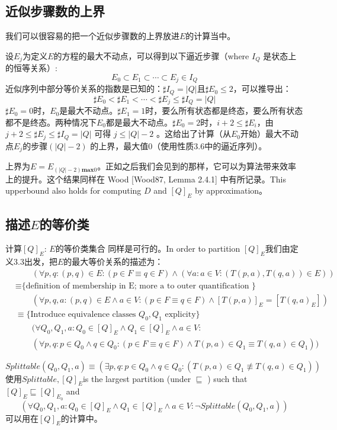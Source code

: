 \subsection{近似步骤数的上界}
我们可以很容易的把一个近似步骤数的上界放进$E$的计算当中。

设$E_j$为定义$E$的方程的最大不动点，可以得到以下逼近步骤（where $I_Q$ 是状态上的恒等关系）:
$$ E_0 \subset E_1 \subset \cdots \subset E_j \in I_Q $$
近似序列中部分等价关系的指数是已知的：$\sharp I_Q = |Q| \mbox{且} \sharp E_0 \leq 2$，可以推导出：
$$ \sharp E_0 < \sharp E_1 < \cdots < \sharp E_j \leq \sharp I_Q = |Q| $$
$\sharp E_0=0$时，$E_0$是最大不动点。$\sharp E_1=1$时，要么所有状态都是终态，要么所有状态都不是终态。两种情况下$E_0$都是最大不动点。$\sharp E_0=2$时，$i+2 \leq \sharp E_i$，由 $ j+2 \leq \sharp E_j \leq \sharp I_Q = |Q| $ 可得 $j \leq |Q|-2 $ 。这给出了计算（从$E_0$开始）最大不动点$E_j$的步骤$(|Q|-2)$ 的上界，最大值0（使用性质3.6中的逼近序列）。

上界为$E=E_{(|Q|-2)\textbf{max} 0}$。正如之后我们会见到的那样，它可以为算法带来效率上的提升。这个结果同样在 Wood [Wood87, Lemma 2.4.1] 中有所记录。This upperbound also holds for computing $D$ and $[Q]_E$ by approximation。


\subsection{描述$E$的等价类}

计算$[Q]_E$: $E$的等价类集合 同样是可行的。In order to partition $[Q]_E$我们由定义3.3出发，把$E$的最大等价关系的描述为：
\begin{equation*}
    \begin{split}
        & \mbox{　　}(\forall p,q : (p,q) \in E : ( p \in F \equiv q \in F ) \land ( \forall a:a \in V : (T(p,a),T(q,a)) \in E )) \\
        & \equiv \mbox{\{ definition of membership in E; more a to outer quantification \} }\\
        & \mbox{　　}(\forall p,q,a:(p,q)\in E \land a\in V : (p \in F \equiv q \in F) \land [T(p,a)]_E = [T(q,a)_E]) \\
        & \equiv \mbox{\{ Introduce equivalence classes } Q_0,Q_1\mbox{ explicity\} } \\
        & \mbox{　　}(\forall Q_0,Q_1,a:Q_0\in [Q]_E \land Q_1 \in [Q]_E \land a \in V : \\
        & \mbox{　　}(\forall p,q:p\in Q_0 \land q\in Q_0 : (p \in F \equiv q \in F) \land T(p,a) \in Q_1 \equiv T(q,a) \in Q_1))
    \end{split}
\end{equation*}
\newline

$$ Splittable(Q_0,Q_1,a) \equiv (\exists p,q:p\in Q_0 \land q\in Q_0 : (T(p,a) \in Q_1 \not\equiv T(q,a) \in Q_1)) $$
使用$Splittable,[Q]_E$is the largest partition (under $\sqsubseteq$ ) such that $[Q]_E \sqsubseteq [Q]_{E_0}$ and
$$ (\forall Q_0,Q_1,a:Q_0 \in [Q]_E \land Q_1 \in [Q]_E \land a \in V : \neg Splittable(Q_0,Q_1,a)) $$
可以用在$[Q]_E$的计算中。